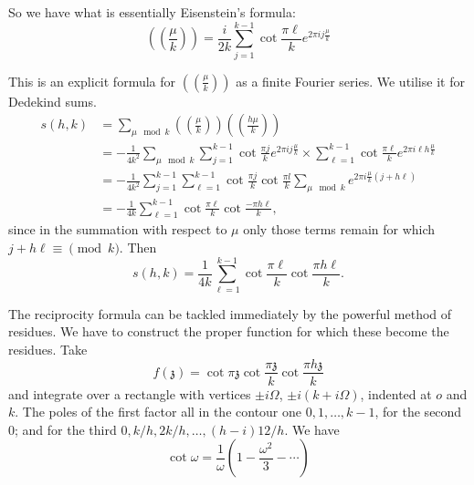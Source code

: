 So we have what is essentially Eisenstein's formula:
$$
\left( \left(\frac{\mu}{k} \right)\right)= \frac{i}{2k}
\sum^{k-1}_{j=1} \cot \frac{\pi \ell}{k} e^{2 \pi i j \frac{\mu}{k}}
$$

This is an explicit formula for $\left( \left(\frac{\mu}{k}
\right)\right)$ as a finite Fourier series. We utilise it for Dedekind
sums. 
\begin{align*}
  s(h, k) & = \sum_{\mu \mod k}\left( \left(\frac{\mu}{k}
  \right)\right) \left( \left(\frac{h\mu}{k} \right)\right)\\
  & = - \frac{1}{4k^2} \sum_{\mu \mod k} \sum^{k-1}_{j=1} \cot
  \frac{\pi j}{k} e^{2 \pi i j \frac{\mu}{k}} \times
  \sum^{k-1}_{\ell=1} \cot \frac{\pi \ell}{k} e^{2 \pi i \ell h
    \frac{\mu}{k}}\\
  & = - \frac{1}{4k^2} \sum^{k-1}_{j=1} \sum^{k-1}_{\ell=1} \cot
  \frac{\pi j}{k} \cot \frac{\pi l}{k} \sum_{\mu \mod k} e^{2 \pi i \frac{\mu}{k}(j+
    h\ell)}\\
  & = - \frac{1}{4k} \sum^{k-1}_{\ell=1} \cot 
  \frac{\pi \ell}{k} \cot \frac{- \pi h \ell}{k},
\end{align*}\pageoriginale
since in the summation with respect to $\mu$ only those terms remain
for which $j+ h\ell \equiv \pmod{k}$. Then
$$
s(h, k)= \frac{1}{4k} \sum^{k-1}_{\ell=1} \cot \frac{\pi \ell}{k} \cot
\frac{\pi h \ell}{k}.
$$

The reciprocity formula can be tackled immediately by the powerful\break
method of residues. We have to construct the proper function for which
these become the residues. Take 
$$
f (\mathfrak{z}) = \cot \pi \mathfrak{z} \cot \frac{\pi \mathfrak{z}}{k}
\cot \frac{\pi h \mathfrak{z}}{k}
$$
and integrate over a rectangle with vertices $\pm i \Omega$, $\pm i
(k+ i \Omega)$, indented at $o$ and $k$. The poles of the first factor
all in the contour one $0, 1, \ldots, k-1$, for the second $0$; and
for the third $0, k/h, 2k/h, \ldots , (h-i)12/h$. We have 
$$
\cot \omega = \frac{1}{\omega} \left(1- \frac{\omega^2}{3}- \cdots \right)
$$\pageoriginale

